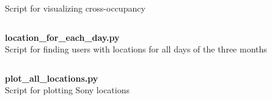 Script for visualizing cross-occupancy
\inputminted[mathescape,
               linenos,
               numbersep=5pt,
               gobble=2,
               frame=lines,
               framesep=2mm]{python}{../tools/scripts/find_user_criteria_for_dataset.py}

\newpage
\textbf{\Large location\_for\_each\_day.py}\\

Script for finding users with locations for all days of the three months
\inputminted[mathescape,
               linenos,
               numbersep=5pt,
               gobble=2,
               frame=lines,
               framesep=2mm]{python}{../tools/scripts/location_for_each_day.py}

\newpage
\textbf{\Large plot\_all\_locations.py}\\
Script for plotting Sony locations
\inputminted[mathescape,
               linenos,
               numbersep=5pt,
               gobble=2,
               frame=lines,
               framesep=2mm]{python}{../tools/scripts/plot_all_locations.py}

